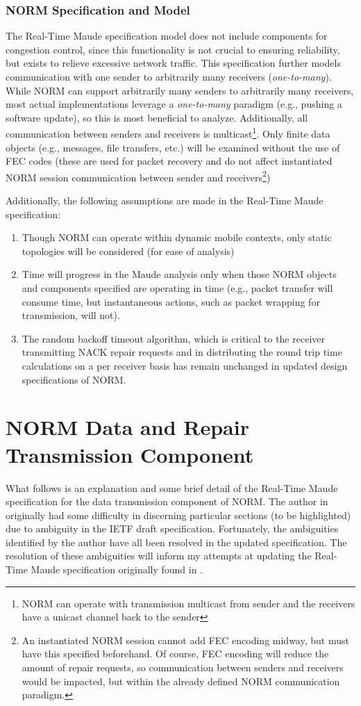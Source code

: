 \documentclass[10pt, journal]{IEEEtran}
\begin{document}
\subsubsection{NORM Specification and Model}
The Real-Time Maude specification model does not include components for congestion control, since this functionality is not crucial to ensuring reliability, but exists to relieve excessive network traffic. This specification further models communication with one sender to arbitrarily many receivers (\textit{one-to-many}). While NORM can support arbitrarily many senders to arbitrarily many receivers, most actual implementations leverage a \textit{one-to-many} paradigm (e.g., pushing a software update), so this is most beneficial to analyze. Additionally, all communication between senders and receivers is multicast\footnote{NORM can operate with transmission multicast from sender and the receivers have a unicast channel back to the sender}. Only finite data objects (e.g., messages, file transfers, etc.) will be examined without the use of FEC codes (these are used for packet recovery and do not affect instantiated NORM session communication between sender and receivers\footnote{An instantiated NORM session cannot add FEC encoding midway, but must have this specified beforehand. Of course, FEC encoding will reduce the amount of repair requests, so communication between senders and receivers would be impacted, but within the already defined NORM communication paradigm.})

Additionally, the following assumptions are made in the Real-Time Maude specification:
\begin{enumerate}
	\item Though NORM can operate within dynamic mobile contexts, only static topologies will be considered (for ease of analysis)
	\item Time will progress in the Maude analysis only when those NORM objects and components specified are operating in time (e.g., packet transfer will consume time, but instantaneous actions, such as packet wrapping for transmission, will not). 
	\item The random backoff timeout algorithm, which is critical to the receiver transmitting NACK repair requests and in distributing the round trip time calculations on a per receiver basis has remain unchanged in updated design specifications of NORM.
\end{enumerate}

\section{NORM Data and Repair Transmission Component}
What follows is an explanation and some brief detail of the Real-Time Maude specification for the data transmission component of NORM. The author in \cite{Lien2004} originally had some difficulty in discerning particular sections (to be highlighted) due to ambiguity in the IETF draft specification. Fortunately, the ambiguities identified by the author have all been resolved in the updated specification. The resolution of these ambiguities will inform my attempts at updating the Real-Time Maude specification originally found in \cite{Lien2004}.
\end{document}
